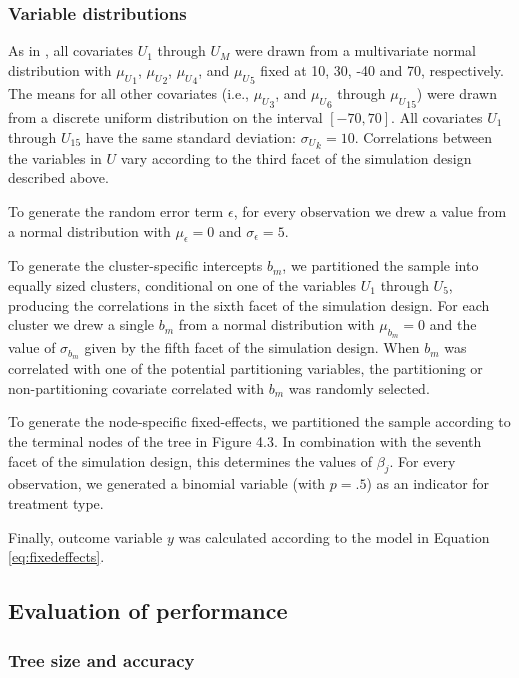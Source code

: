 \documentclass[nobf,doc]{apa}
\begin{document}
\subsubsection{Variable distributions}

As in , all covariates $U_1$ through $U_{M}$ were drawn from a multivariate normal distribution with ${\mu_U}_1$, ${\mu_U}_2$, ${\mu_U}_4$, and ${\mu_U}_5$ fixed at 10, 30, -40 and 70, respectively. The means for all other covariates (i.e., ${\mu_U}_3$, and ${\mu_U}_6$ through ${\mu_U}_{15}$) were drawn from a discrete uniform distribution on the interval $[-70,70]$. All covariates $U_1$ through $U_{15}$ have the same standard deviation: ${\sigma_U}_k = 10$. Correlations between the variables in $U$ vary according to the third facet of the simulation design described above.

To generate the random error term $\epsilon$, for every observation we drew a value from a normal distribution with $\mu_{\epsilon} = 0$ and $\sigma_{\epsilon} = 5$. 

To generate the cluster-specific intercepts $b_m$, we partitioned the sample into equally sized clusters, conditional on one of the variables $U_1$ through $U_5$, producing the correlations in the sixth facet of the simulation design. For each cluster we drew a single $b_m$ from a normal distribution with $\mu_{b_m} = 0$ and the value of $\sigma_{b_m}$ given by the fifth facet of the simulation design. When $b_m$ was correlated with one of the potential partitioning variables, the partitioning or non-partitioning covariate correlated with $b_m$ was randomly selected.

To generate the node-specific fixed-effects, we partitioned the sample according to the terminal nodes of the tree in Figure 4.3. In combination with the seventh facet of the simulation design, this determines the values of $\beta_j$. For every observation, we generated a binomial variable (with $p =.5$) as an indicator for treatment type. 

Finally, outcome variable $y$ was calculated according to the model in Equation \ref{eq:fixedeffects}. 




\subsection{Evaluation of performance}

\subsubsection{Tree size and accuracy} 
\end{document}
